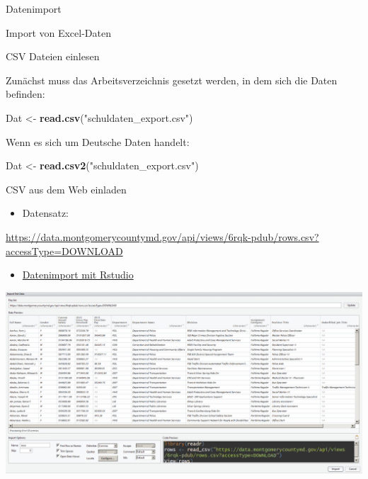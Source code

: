 \documentclass[ignorenonframetext,]{beamer}
\newenvironment{Shaded}{}{}
\newcommand{\KeywordTok}[1]{\textcolor[rgb]{0.00,0.44,0.13}{\textbf{{#1}}}}
\newcommand{\StringTok}[1]{\textcolor[rgb]{0.25,0.44,0.63}{{#1}}}
\newcommand{\NormalTok}[1]{{#1}}
\providecommand{\tightlist}{%
\setlength{\itemsep}{0pt}\setlength{\parskip}{0pt}}
\begin{document}
\begin{frame}[fragile]{Datenimport}
\begin{block}{Import von Excel-Daten}
\end{block}

\begin{block}{CSV Dateien einlesen}

Zunächst muss das Arbeitsverzeichnis gesetzt werden, in dem sich die
Daten befinden:

\begin{Shaded}
\begin{Highlighting}[]
\NormalTok{Dat <-}\StringTok{ }\KeywordTok{read.csv}\NormalTok{(}\StringTok{"schuldaten_export.csv"}\NormalTok{)}
\end{Highlighting}
\end{Shaded}

Wenn es sich um Deutsche Daten handelt:

\begin{Shaded}
\begin{Highlighting}[]
\NormalTok{Dat <-}\StringTok{ }\KeywordTok{read.csv2}\NormalTok{(}\StringTok{"schuldaten_export.csv"}\NormalTok{)}
\end{Highlighting}
\end{Shaded}

\end{block}

\begin{block}{CSV aus dem Web einladen}

\begin{itemize}
\tightlist
\item
  Datensatz:
\end{itemize}

\url{https://data.montgomerycountymd.gov/api/views/6rqk-pdub/rows.csv?accessType=DOWNLOAD}

\begin{itemize}
\tightlist
\item
  \href{https://support.rstudio.com/hc/en-us/articles/218611977-Importing-Data-with-RStudio}{Datenimport
  mit Rstudio}
\end{itemize}

\includegraphics{./tex2pdf.9796/74bec32bd4334be5ae8e5422ac2c166dd8414ddb.png}


\end{block}
\end{frame}
\end{document}
